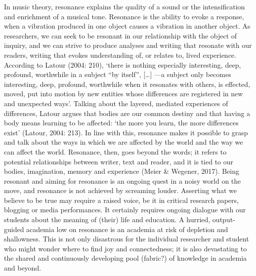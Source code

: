 In music theory, resonance explains the quality of a sound or the intensification and enrichment of a musical tone. Resonance is the ability to evoke a response, when a vibration produced in one object causes a vibration in another object. As researchers, we can seek to be resonant in our relationship with the object of inquiry, and we can strive to produce analyses and writing that resonate with our readers, writing that evokes understanding of, or relates to, lived experience. According to Latour (2004: 210), ‘there is nothing especially interesting, deep, profound, worthwhile in a subject \enquote{by itself}, […] ---a subject only becomes interesting, deep, profound, worthwhile when it resonates with others, is effected, moved, put into motion by new entities whose differences are registered in new and unexpected ways’. Talking about the layered, mediated experiences of differences, Latour argues that bodies are our common destiny and that having a body means learning to be affected: ‘the more you learn, the more differences exist’ (Latour, 2004: 213). In line with this, resonance makes it possible to grasp and talk about the ways in which we are affected by the world and the way we can affect the world. Resonance, then, goes beyond the words; it refers to potential relationships between writer, text and reader, and it is tied to our bodies, imagination, memory and experience (Meier \& Wegener, 2017). Being resonant and aiming for resonance is an ongoing quest in a noisy world on the move, and resonance is not achieved by screaming louder. Asserting what we believe to be true may require a raised voice, be it in critical research papers, blogging or media performances. It certainly requires ongoing dialogue with our students about the meaning of (their) life and education. A hurried, output-guided academia low on resonance is an academia at risk of depletion and shallowness. This is not only disastrous for the individual researcher and student who might wonder where to find joy and connectedness; it is also devastating to the shared and continuously developing pool (fabric?) of knowledge in academia and beyond.  
\par
